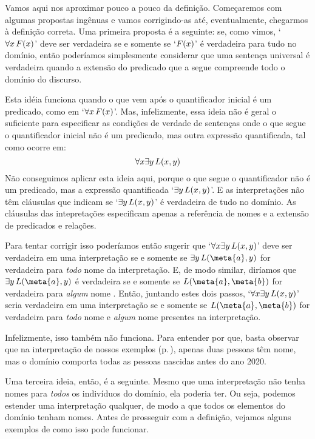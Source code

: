 Vamos aqui nos aproximar pouco a pouco da definição.
Começaremos com algumas propostas ingênuas e vamos corrigindo-as até, eventualmente, chegarmos à definição correta.
Uma primeira proposta é a seguinte:
se, como vimos, `$\forall x\,\mathord{F}(x)$' deve ser verdadeira se e somente se `$\mathord{F}(x)$' é verdadeira para tudo no domínio,
então poderíamos simplesmente considerar que uma sentença universal é verdadeira quando a extensão do predicado que a segue compreende todo o domínio do discurso.

Esta idéia funciona quando o que vem após o quantificador inicial é um predicado, como em  `$\forall x\,\mathord{F}(x)$'.
Mas, infelizmente, essa ideia não é geral o suficiente para especificar as condições de verdade de sentenças onde o que segue o quantificador inicial não é um predicado, mas outra expressão quantificada, tal como ocorre em:
$$\forall x \exists y\,\mathord{L}(x,y)$$
Não conseguimos aplicar esta ideia aqui, porque o que segue o quantificador não é um predicado, mas a expressão quantificada `$\exists y\,\mathord{L}(x,y)$'.
E as interpretações não têm cláusulas que indicam se `$\exists y\,\mathord{L}(x,y)$' é verdadeira de tudo no domínio.
As cláusulas das intepretações especificam apenas a referência de nomes e a extensão de predicados e relações.

Para tentar corrigir isso poderíamos então sugerir que `$\forall x \exists y\, \mathord{L}(x,y)$' deve ser verdadeira em uma interpretação se e somente se $\exists y\, \atom{L}{\meta{a},y}$ for verdadeira para \emph{todo} nome  da interpretação.
E, de modo similar, diríamos que $\exists y\, \atom{L}{\meta{a},y}$ é verdadeira se e somente se $\atom{L}{\meta{a}, \meta{b}}$ for verdadeira para \emph{algum} nome .
Então, juntando estes dois passos, `$\forall x \exists y\, \mathord{L}(x,y)$' seria verdadeira em uma interpretação se e somente se $\atom{L}{\meta{a}, \meta{b}}$ for verdadeira para \emph{todo} nome  e \emph{algum} nome  presentes na interpretação.

Infelizmente, isso também não funciona.
Para entender por que, basta observar que na interpretação de nossos exemplos (p.\,\pageref{i:Sample}), apenas duas pessoas têm nome, mas o domínio comporta todas as pessoas nascidas antes do ano 2020.

Uma terceira ideia, então, é a seguinte.
Mesmo que uma interpretação não tenha nomes para \emph{todos} os indivíduos do domínio, ela poderia ter.
Ou seja, podemos estender uma interpretação qualquer, de modo a que todos os elementos do domínio tenham nomes.
Antes de prosseguir com a definição, vejamos alguns exemplos de como isso pode funcionar.

